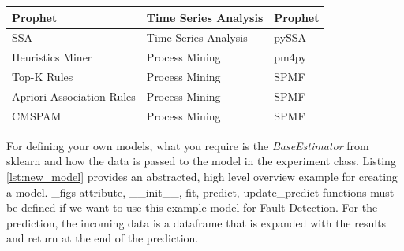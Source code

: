 \documentclass[preprint,12pt, a4paper]{elsarticle}
\begin{document}
\begin{table}[h!]
\begin{tabular}{|l|l|l|}
\hline
Prophet & Time Series Analysis & Prophet \citep{prophet} \\
\hline
SSA & Time Series Analysis & pySSA \citep{pySSA} \\
\hline
Heuristics Miner & Process Mining & pm4py \citep{pm4py} \\
\hline
Top-K Rules & Process Mining & SPMF \citep{fournier2016spmf} \\
\hline
Apriori Association Rules & Process Mining & SPMF \citep{fournier2016spmf} \\
\hline
CMSPAM & Process Mining & SPMF \citep{fournier2016spmf} \\
\hline
\end{tabular}
\label{imp_models}
\end{table}

For defining your own models, what you require is the \textit{BaseEstimator} from sklearn and how the data is passed to the model in the experiment class. Listing \ref{lst:new_model} provides an abstracted, high level overview example for creating a model. \_figs attribute, \_\_init\_\_, fit, predict, update\_predict functions must be defined if we want to use this example model for Fault Detection.  For the prediction, the incoming data is a dataframe that is expanded with the results and return at the end of the prediction.
 
\end{document}
